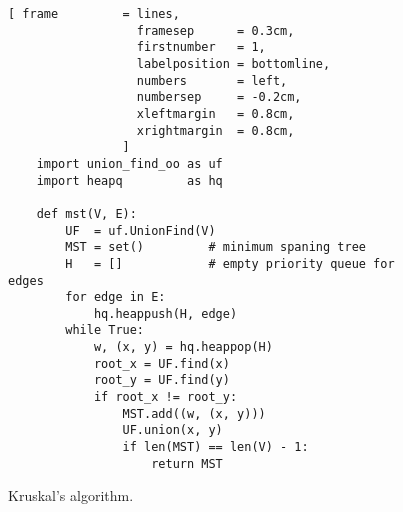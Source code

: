 \begin{figure}[!ht]
\centering
\begin{Verbatim}[ frame         = lines, 
                  framesep      = 0.3cm, 
                  firstnumber   = 1,
                  labelposition = bottomline,
                  numbers       = left,
                  numbersep     = -0.2cm,
                  xleftmargin   = 0.8cm,
                  xrightmargin  = 0.8cm,
                ]
    import union_find_oo as uf
    import heapq         as hq

    def mst(V, E):
        UF  = uf.UnionFind(V)
        MST = set()         # minimum spaning tree
        H   = []            # empty priority queue for edges
        for edge in E:
            hq.heappush(H, edge)
        while True:
            w, (x, y) = hq.heappop(H)
            root_x = UF.find(x)
            root_y = UF.find(y)
            if root_x != root_y:
                MST.add((w, (x, y)))
                UF.union(x, y)
                if len(MST) == len(V) - 1:
                    return MST
\end{Verbatim}
\vspace*{-0.3cm}
\caption{Kruskal's algorithm.}
\label{fig:Kruskal.ipynb}
\end{figure}


